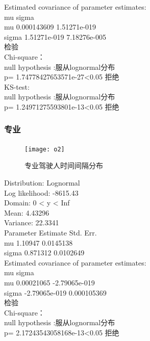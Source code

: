 Estimated covariance of parameter estimates:\\
       mu            sigma       \\
mu      0.000143609  1.51271e-019\\
sigma  1.51271e-019  7.18276e-005\\

检验\\
Chi-square：\\
null hypothesis :服从lognormal分布\\
p= 1.74778427653571e-27<0.05 拒绝\\
KS-test:\\
null hypothesis :服从lognormal分布\\
p= 1.24971275593801e-13<0.05 拒绝\\






\subsubsection{专业}
\begin{figure}[htpb]
	\centering
	\label{tgap_distru:pro}
	\texttt{[image: o2]}
	\caption{专业驾驶人时间间隔分布}
\end{figure}

Distribution:    Lognormal\\
Log likelihood:  -8615.43\\
Domain:          0 < y < Inf\\
Mean:            4.43296\\
Variance:        22.3341\\

Parameter  Estimate  Std. Err.\\
mu          1.10947  0.0145138\\
sigma      0.871312  0.0102649\\

Estimated covariance of parameter estimates:\\
       mu             sigma        \\
mu        0.00021065  -2.79065e-019\\
sigma  -2.79065e-019    0.000105369\\


检验\\
Chi-square：\\
null hypothesis :服从lognormal分布\\
p= 2.17243543058168e-13<0.05 拒绝\\

